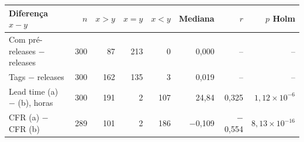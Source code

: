 \begin{tabular}{lrrrrrrr}
\hline
Diferença $x-y$ & $n$ & $x>y$ & $x=y$ & $x<y$ & Mediana & $r$ & $p$ Holm \\
\hline
Com pré-releases $-$ releases & 300 & 87 & 213 & 0 & 0,000 & -- & -- \\
Tags $-$ releases & 300 & 162 & 135 & 3 & 0,019 & -- & -- \\
Lead time (a) $-$ (b), horas & 300 & 191 & 2 & 107 & 24,84 & 0,325 & $1{,}12\times 10^{-6}$ \\
CFR (a) $-$ CFR (b) & 289 & 101 & 2 & 186 & $-$0,109 & $-$0,554 & $8{,}13\times 10^{-16}$ \\
\hline
\end{tabular}
